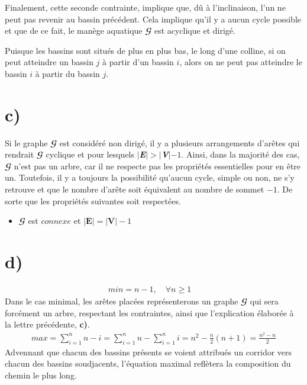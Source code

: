 \documentclass[11pt,a4paper, oneside, oldfontcommands]{memoir}
\newcommand{\G}{$\mathbfcal{G}$}
\newcommand{\V}{$\textbf{\textit{V}}$}
\newcommand{\E}{$\textbf{\textit{E}}$}
\begin{document}
  
  Finalement, cette seconde contrainte, implique que, dû à l'inclinaison, l'un ne peut pas revenir au bassin précédent. Cela implique qu'il y a aucun cycle possible et que de ce fait, le manège aquatique \G{} est acyclique et dirigé.\\
  
  \begin{siderules}
    Puisque les bassins sont situés de plus en plus bas, le long d'une colline, si on peut atteindre un bassin $j$ à partir d'un bassin $i$, alors on ne peut pas atteindre le bassin $i$ à partir du bassin $j$.
  \end{siderules}


\section{c)}
Si le graphe \G{} est considéré non dirigé, il y a plusieurs arrangements d'arêtes qui rendrait \G{} cyclique et pour lesquels $|\E{}| > |\V{}| - 1$. Ainsi, dans la majorité des cas, \G{} n'est pas un arbre, car il ne respecte pas les propriétés essentielles pour en être un. Toutefois, il y a toujours la possibilité qu'aucun cycle, simple ou non, ne s'y retrouve et que le nombre d'arête soit équivalent au nombre de sommet $- 1$. De sorte que les propriétés suivantes soit respectées.\\
  \begin{itemize}
    \item\G{} est $connexe$ et $|\textbf{E}| = |\textbf{V}| - 1$
  \end{itemize} 

\section{d)}



  \begin{gather*}
    min = n-1,\quad \forall n \geq 1\quad
  \end{gather*}
  Dans le cas minimal, les arêtes placées représenterons un graphe \G{} qui sera forcément un arbre, respectant les contraintes, ainsi que l'explication élaborée à la lettre précédente, \textbf{c)}.\\
  \begin{gather*}
    max = \sum_{i=1}^{n} {n-i}=\sum_{i=1}^{n} {n}-\sum_{i=1}^{n} {i}=n^{2}-\frac{n}{2}(n+1)=\frac{n^{2}-n}{2}
  \end{gather*}
  Advennant que chacun des bassins présents se voient attribués un corridor vers chacun des bassins soudjacents, l'équation maximal reflètera la composition du chemin le plus long. 
\end{document}
